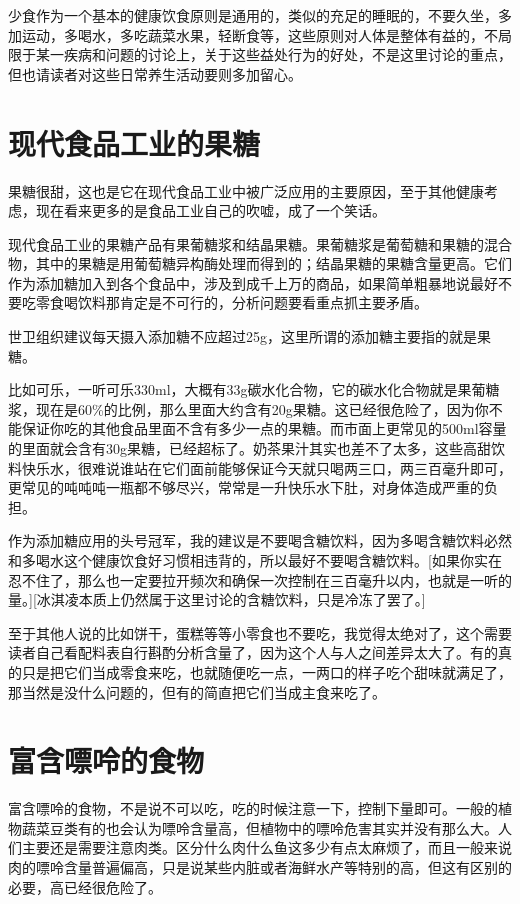 \documentclass[12pt,oneside]{book}
\begin{document}
少食作为一个基本的健康饮食原则是通用的，类似的充足的睡眠的，不要久坐，多加运动，多喝水，多吃蔬菜水果，轻断食等，这些原则对人体是整体有益的，不局限于某一疾病和问题的讨论上，关于这些益处行为的好处，不是这里讨论的重点，但也请读者对这些日常养生活动要则多加留心。


\section{现代食品工业的果糖}
果糖很甜，这也是它在现代食品工业中被广泛应用的主要原因，至于其他健康考虑，现在看来更多的是食品工业自己的吹嘘，成了一个笑话。

现代食品工业的果糖产品有果葡糖浆和结晶果糖。果葡糖浆是葡萄糖和果糖的混合物，其中的果糖是用葡萄糖异构酶处理而得到的；结晶果糖的果糖含量更高。它们作为添加糖加入到各个食品中，涉及到成千上万的商品，如果简单粗暴地说最好不要吃零食喝饮料那肯定是不可行的，分析问题要看重点抓主要矛盾。

世卫组织建议每天摄入添加糖不应超过25g，这里所谓的添加糖主要指的就是果糖。

比如可乐，一听可乐330ml，大概有33g碳水化合物，它的碳水化合物就是果葡糖浆，现在是60\%的比例，那么里面大约含有20g果糖。这已经很危险了，因为你不能保证你吃的其他食品里面不含有多少一点的果糖。而市面上更常见的500ml容量的里面就会含有30g果糖，已经超标了。奶茶果汁其实也差不了太多，这些高甜饮料快乐水，很难说谁站在它们面前能够保证今天就只喝两三口，两三百毫升即可，更常见的吨吨吨一瓶都不够尽兴，常常是一升快乐水下肚，对身体造成严重的负担。

作为添加糖应用的头号冠军，我的建议是不要喝含糖饮料，因为多喝含糖饮料必然和多喝水这个健康饮食好习惯相违背的，所以最好不要喝含糖饮料。[如果你实在忍不住了，那么也一定要拉开频次和确保一次控制在三百毫升以内，也就是一听的量。][冰淇凌本质上仍然属于这里讨论的含糖饮料，只是冷冻了罢了。]

至于其他人说的比如饼干，蛋糕等等小零食也不要吃，我觉得太绝对了，这个需要读者自己看配料表自行斟酌分析含量了，因为这个人与人之间差异太大了。有的真的只是把它们当成零食来吃，也就随便吃一点，一两口的样子吃个甜味就满足了，那当然是没什么问题的，但有的简直把它们当成主食来吃了。





\section{富含嘌呤的食物}
富含嘌呤的食物，不是说不可以吃，吃的时候注意一下，控制下量即可。一般的植物蔬菜豆类有的也会认为嘌呤含量高，但植物中的嘌呤危害其实并没有那么大。人们主要还是需要注意肉类。区分什么肉什么鱼这多少有点太麻烦了，而且一般来说肉的嘌呤含量普遍偏高，只是说某些内脏或者海鲜水产等特别的高，但这有区别的必要，高已经很危险了。
\end{document}
